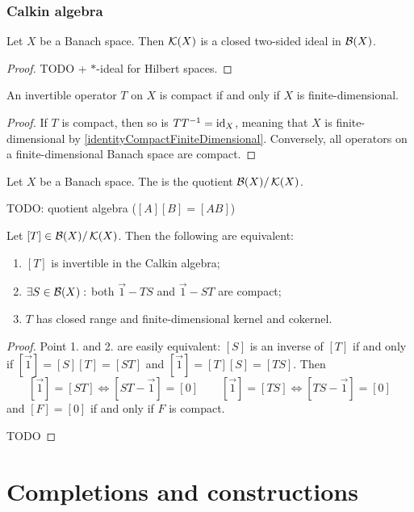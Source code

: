 \subsubsection{Calkin algebra}
\begin{proposition}
Let $X$ be a Banach space. Then $\operatorname{\mathcal{K}}(X)$ is a closed two-sided ideal in $\operatorname{\mathcal{B}}(X)$.
\end{proposition}
\begin{proof}
TODO + $*$-ideal for Hilbert spaces.
\end{proof}
\begin{corollary}
An invertible operator $T$ on $X$ is compact \textup{if and only if} $X$ is finite-dimensional.
\end{corollary}
\begin{proof}
If $T$ is compact, then so is $TT^{-1} = \operatorname{id}_X$, meaning that $X$ is finite-dimensional by \ref{identityCompactFiniteDimensional}. Conversely, all operators on a finite-dimensional Banach space are compact.
\end{proof}

\begin{definition}
Let $X$ be a Banach space. The  is the quotient $\operatorname{\mathcal{B}}(X)/\operatorname{\mathcal{K}}(X)$.
\end{definition}
TODO: quotient algebra ($[A][B] = [AB]$)

\begin{proposition}
Let $[T]\in\operatorname{\mathcal{B}}(X)/\operatorname{\mathcal{K}}(X)$. Then the following are equivalent:
\begin{enumerate}
\item $[T]$ is invertible in the Calkin algebra;
\item $\exists S\in\operatorname{\mathcal{B}}(X):$ both $\vec{1}-TS$ and $\vec{1}-ST$ are compact;
\item $T$ has closed range and finite-dimensional kernel and cokernel. 
\end{enumerate}
\end{proposition}
\begin{proof}
Point 1. and 2. are easily equivalent: $[S]$ is an inverse of $[T]$ if and only if $[\vec{1}] = [S][T] = [ST]$ and $[\vec{1}] = [T][S] = [TS]$. Then
\[ [\vec{1}] = [ST] \iff [ST - \vec{1}] = [0] \qquad [\vec{1}] = [TS] \iff [TS - \vec{1}] = [0] \]
and $[F]=[0]$ if and only if $F$ is compact.

TODO
\end{proof}


\section{Completions and constructions}

